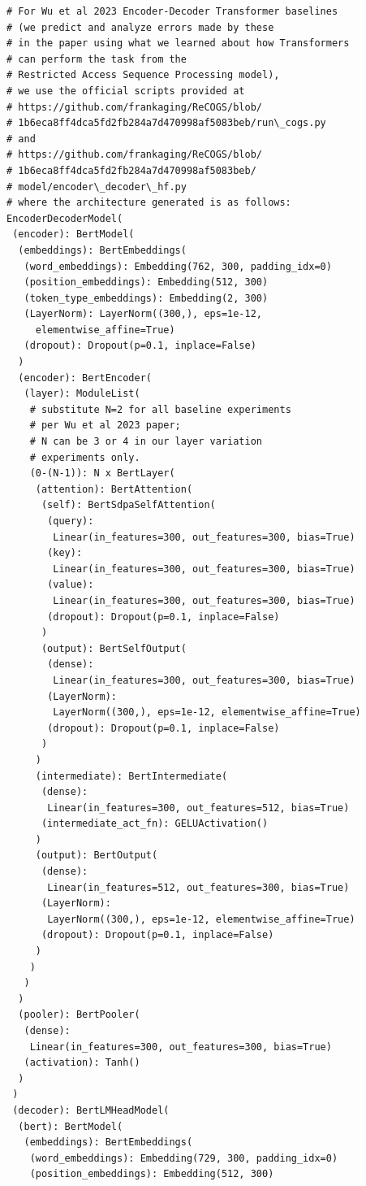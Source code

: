 \documentclass[11pt]{article}
\begin{document}
\begin{tiny}
\begin{verbatim}
# For Wu et al 2023 Encoder-Decoder Transformer baselines 
# (we predict and analyze errors made by these 
# in the paper using what we learned about how Transformers 
# can perform the task from the 
# Restricted Access Sequence Processing model),
# we use the official scripts provided at 
# https://github.com/frankaging/ReCOGS/blob/
# 1b6eca8ff4dca5fd2fb284a7d470998af5083beb/run\_cogs.py
# and 
# https://github.com/frankaging/ReCOGS/blob/
# 1b6eca8ff4dca5fd2fb284a7d470998af5083beb/
# model/encoder\_decoder\_hf.py
# where the architecture generated is as follows:
EncoderDecoderModel(
 (encoder): BertModel(
  (embeddings): BertEmbeddings(
   (word_embeddings): Embedding(762, 300, padding_idx=0)
   (position_embeddings): Embedding(512, 300)
   (token_type_embeddings): Embedding(2, 300)
   (LayerNorm): LayerNorm((300,), eps=1e-12, 
     elementwise_affine=True)
   (dropout): Dropout(p=0.1, inplace=False)
  )
  (encoder): BertEncoder(
   (layer): ModuleList(
    # substitute N=2 for all baseline experiments
    # per Wu et al 2023 paper; 
    # N can be 3 or 4 in our layer variation 
    # experiments only.
    (0-(N-1)): N x BertLayer(
     (attention): BertAttention(
      (self): BertSdpaSelfAttention(
       (query): 
        Linear(in_features=300, out_features=300, bias=True)
       (key): 
        Linear(in_features=300, out_features=300, bias=True)
       (value): 
        Linear(in_features=300, out_features=300, bias=True)
       (dropout): Dropout(p=0.1, inplace=False)
      )
      (output): BertSelfOutput(
       (dense): 
        Linear(in_features=300, out_features=300, bias=True)
       (LayerNorm): 
        LayerNorm((300,), eps=1e-12, elementwise_affine=True)
       (dropout): Dropout(p=0.1, inplace=False)
      )
     )
     (intermediate): BertIntermediate(
      (dense): 
       Linear(in_features=300, out_features=512, bias=True)
      (intermediate_act_fn): GELUActivation()
     )
     (output): BertOutput(
      (dense): 
       Linear(in_features=512, out_features=300, bias=True)
      (LayerNorm): 
       LayerNorm((300,), eps=1e-12, elementwise_affine=True)
      (dropout): Dropout(p=0.1, inplace=False)
     )
    )
   )
  )
  (pooler): BertPooler(
   (dense): 
    Linear(in_features=300, out_features=300, bias=True)
   (activation): Tanh()
  )
 )
 (decoder): BertLMHeadModel(
  (bert): BertModel(
   (embeddings): BertEmbeddings(
    (word_embeddings): Embedding(729, 300, padding_idx=0)
    (position_embeddings): Embedding(512, 300)

\end{verbatim}
\end{tiny}
\end{document}
